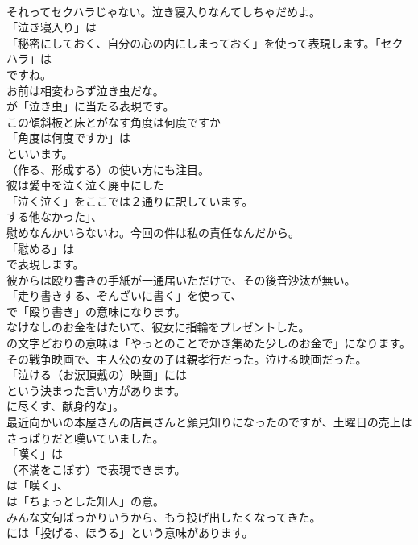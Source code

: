 \documentclass[8pt]{extreport}
\begin{document}
\begin{CJK}{UTF8}{min}
\\	それってセクハラじゃない。泣き寝入りなんてしちゃだめよ。 
\\	「泣き寝入り」は
\\	「秘密にしておく、自分の心の内にしまっておく」を使って表現します。「セクハラ」は
\\	ですね。	
\\	お前は相変わらず泣き虫だな。 
\\	が「泣き虫」に当たる表現です。	
\\	この傾斜板と床とがなす角度は何度ですか 
\\	「角度は何度ですか」は
\\	といいます。
\\	（作る、形成する）の使い方にも注目。	
\\	彼は愛車を泣く泣く廃車にした 
\\	「泣く泣く」をここでは２通りに訳しています。
\\	する他なかった」、	
\\	慰めなんかいらないわ。今回の件は私の責任なんだから。 
\\	「慰める」は
\\	で表現します。	
\\	彼からは殴り書きの手紙が一通届いただけで、その後音沙汰が無い。 
\\	「走り書きする、ぞんざいに書く」を使って、
\\	で「殴り書き」の意味になります。	
\\	なけなしのお金をはたいて、彼女に指輪をプレゼントした。 
\\	の文字どおりの意味は「やっとのことでかき集めた少しのお金で」になります。	
\\	その戦争映画で、主人公の女の子は親孝行だった。泣ける映画だった。 
\\	「泣ける（お涙頂戴の）映画」には
\\	という決まった言い方があります。
\\	に尽くす、献身的な」。	
\\	最近向かいの本屋さんの店員さんと顔見知りになったのですが、土曜日の売上はさっぱりだと嘆いていました。 
\\	「嘆く」は 
\\	（不満をこぼす）で表現できます。
\\	は「嘆く」、
\\	は「ちょっとした知人」の意。	
\\	みんな文句ばっかりいうから、もう投げ出したくなってきた。 
\\	には「投げる、ほうる」という意味があります。

\end{CJK}
\end{document}

